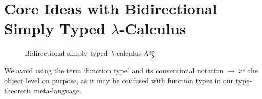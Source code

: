 
\section{Core Ideas with Bidirectional Simply Typed \texorpdfstring{$\lambda$}{lambda}-Calculus} \label{sec:key-ideas}
\begin{figure}
  \centering
  \small
  \caption{Bidirectional simply typed $\lambda$-calculus $\Lambda^{\Leftrightarrow}_{\mathbin{\bm{\supset}}}$}
  \label{fig:bi-stlc}
\end{figure}
\begin{remark}
  We avoid using the term `function type' and its conventional notation $\to$ at the object level on purpose, as it may be confused with function types in our type-theoretic meta-language.
\end{remark}


